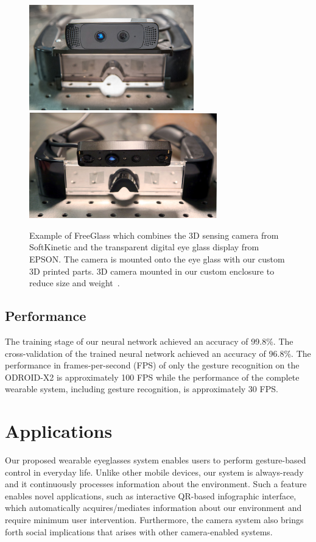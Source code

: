 \begin{figure}
\centering
\includegraphics[height=1.8in]{ch5/figs/wearable/low_res/eyetap_mann_glass.jpg}
\includegraphics[height=1.8in]{ch5/figs/wearable/low_res/eyetap_slim_IMG_2408.jpg}
\caption{Example of FreeGlass which combines the 3D sensing camera from SoftKinetic
and the transparent digital eye glass display from EPSON. The camera is mounted onto the eye glass with our custom 3D printed parts. 3D camera mounted in our custom enclosure to reduce size and weight~\cite{lo2013augmediated}. }
\label{fig:3Dcamera_head}
\end{figure}

\subsection{Performance}
The training stage of our neural network achieved an accuracy of 99.8\%. The cross-validation of the trained neural network achieved an accuracy of 96.8\%. The performance in frames-per-second (FPS) of only the gesture recognition on the ODROID-X2 is approximately 100 FPS while the performance of the complete wearable system, including gesture recognition, is approximately 30 FPS.

\section{Applications}
Our proposed wearable eyeglasses system enables users to perform gesture-based control in everyday life. Unlike other mobile devices, our system is always-ready and it continuously processes information about the environment. Such a feature enables novel applications, such as interactive QR-based infographic interface, which automatically acquires/mediates information about our environment and require minimum user intervention. Furthermore, the camera system also brings forth social implications that arises with other camera-enabled systems.

